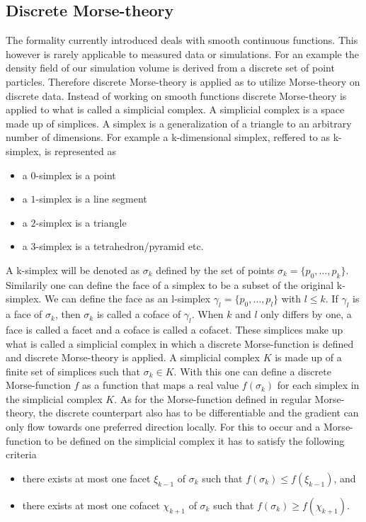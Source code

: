 \subsection{Discrete Morse-theory}
The formality currently introduced deals with smooth continuous functions. This
however is rarely applicable to measured data or simulations. For an example the density field
of our simulation volume is derived from a discrete set of
point particles. Therefore discrete
Morse-theory\cite{FORMAN199890} is applied as to utilize Morse-theory on
discrete data. Instead of working on smooth functions discrete Morse-theory is
applied to what is called a simplicial complex. A simplicial complex is a space made up
of simplices. A simplex is a generalization of
a triangle to an arbitrary number of dimensions. For example a k-dimensional
simplex, reffered to as k-simplex, is represented as
\begin{itemize}
    \item a $0$-simplex is a point
    \item a $1$-simplex is a line segment
    \item a $2$-simplex is a triangle
    \item a $3$-simplex is a tetrahedron/pyramid etc.
\end{itemize}
A k-simplex will be denoted as $\sigma_k$ defined by the set of points
$\sigma_k=\{p_0, \dots,p_k\}$. Similarily one can define the face of a simplex
to be a subset of the original k-simplex. We can define the face as an
l-simplex $\gamma_l=\{p_0,\dots,p_l\}$ with $l\leq k$. If $\gamma_l$ is a face
of $\sigma_k$, then $\sigma_k$ is called a coface of $\gamma_l$. When $k$ and
$l$ only differs by one, a face is called a facet and a coface is called a cofacet. These simplices make up
what is called a simplicial complex in which a discrete Morse-function is
defined and discrete Morse-theory is applied. A simplicial complex $K$ is made
up of a finite set of simplices such that $\sigma_k\in K$. With this one can
define a discrete Morse-function $f$ as a function that maps a real value
$f(\sigma_k)$ for each simplex in the simplicial complex $K$. As for the
Morse-function defined in regular Morse-theory, the discrete counterpart also has
to be differentiable and the gradient can only flow towards one preferred direction
locally. For this to occur and a Morse-function to be defined on the simplicial
complex it has to satisfy the following criteria
\begin{itemize}
    \item there exists at most one facet $\xi_{k-1}$ of $\sigma_{k}$ such
    that $f(\sigma_k)\leq f(\xi_{k-1})$, and
    \item there exists at most one cofacet $\chi_{k+1}$ of $\sigma_{k}$ such
    that $f(\sigma_k)\geq f(\chi_{k+1})$.
\end{itemize}
